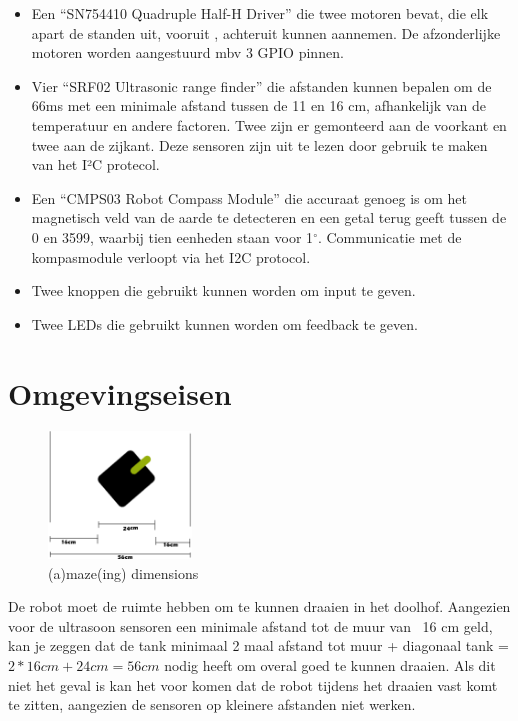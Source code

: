 \documentclass{article}
\begin{document}
\begin{itemize}
\item{Een “SN754410 Quadruple Half-H Driver” die twee motoren bevat, die elk apart de standen uit, vooruit , achteruit kunnen aannemen. De afzonderlijke motoren worden aangestuurd mbv 3 GPIO pinnen.}
\item{Vier “SRF02 Ultrasonic range finder” die afstanden kunnen bepalen om de 66ms met een minimale afstand tussen de 11 en 16 cm, afhankelijk van de temperatuur en andere factoren. Twee zijn er gemonteerd aan de voorkant en twee aan de zijkant. Deze sensoren zijn uit te lezen door gebruik te maken van het I²C protecol.}
\item{Een “CMPS03 Robot Compass Module” die accuraat genoeg is om het magnetisch veld van de aarde te detecteren en een getal terug geeft tussen de 0 en 3599, waarbij tien eenheden staan voor 1$^\circ$. Communicatie met de kompasmodule verloopt via het I2C protocol.}
\item{Twee knoppen die gebruikt kunnen worden om input te geven.}
\item{Twee LEDs die gebruikt kunnen worden om feedback te geven.}
\end{itemize}

\section{Omgevingseisen}
\begin{figure}
  \vspace{-10pt}
  \begin{center}
    \includegraphics[width=0.34\textwidth]{tank_kunst.png}
  \end{center}
  \vspace{-10pt}
  \caption{(a)maze(ing) dimensions}
  \vspace{-50pt}
\end{figure}
De robot moet de ruimte hebben om te kunnen draaien in het doolhof. 
Aangezien voor de ultrasoon sensoren een minimale afstand tot de muur van ~16 cm geld, kan je zeggen dat de tank minimaal
2 maal afstand tot muur + diagonaal tank = $2 * 16 cm + 24 cm= 56 cm$ nodig heeft om overal goed te kunnen draaien. Als dit niet het geval
is kan het voor komen dat de robot tijdens het draaien vast komt te zitten, aangezien de sensoren op kleinere afstanden niet werken.
\end{document}
